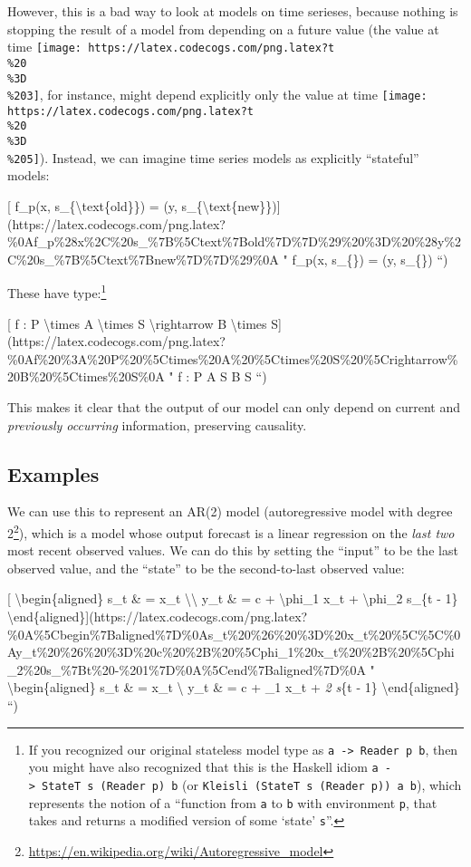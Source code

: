 \documentclass[]{article}
\renewcommand{\href}[2]{#2\footnote{\url{#1}}}
\begin{document}
However, this is a bad way to look at models on time serieses, because nothing
is stopping the result of a model from depending on a future value (the value at
time \texttt{[image: https://latex.codecogs.com/png.latex?t\\\%20\\\%3D\\\%203]}, for
instance, might depend explicitly only the value at time
\texttt{[image: https://latex.codecogs.com/png.latex?t\\\%20\\\%3D\\\%205]}). Instead,
we can imagine time series models as explicitly ``stateful'' models:

{[} f\_p(x, s\_\{\textbackslash{}text\{old\}\}) = (y,
s\_\{\textbackslash{}text\{new\}\}){]}(https://latex.codecogs.com/png.latex?\%0Af\_p\%28x\%2C\%20s\_\%7B\%5Ctext\%7Bold\%7D\%7D\%29\%20\%3D\%20\%28y\%2C\%20s\_\%7B\%5Ctext\%7Bnew\%7D\%7D\%29\%0A
" f\_p(x, s\_\{\}) = (y, s\_\{\}) ``)

These have type:\footnote{If you recognized our original stateless model type as
  \texttt{a\ -\textgreater{}\ Reader\ p\ b}, then you might have also recognized
  that this is the Haskell idiom
  \texttt{a\ -\textgreater{}\ StateT\ s\ (Reader\ p)\ b} (or
  \texttt{Kleisli\ (StateT\ s\ (Reader\ p))\ a\ b}), which represents the notion
  of a ``function from \texttt{a} to \texttt{b} with environment \texttt{p},
  that takes and returns a modified version of some `state' \texttt{s}''.}

{[} f : P \textbackslash{}times A \textbackslash{}times S
\textbackslash{}rightarrow B \textbackslash{}times
S{]}(https://latex.codecogs.com/png.latex?\%0Af\%20\%3A\%20P\%20\%5Ctimes\%20A\%20\%5Ctimes\%20S\%20\%5Crightarrow\%20B\%20\%5Ctimes\%20S\%0A
" f : P \times A \times S \rightarrow B \times S ``)

This makes it clear that the output of our model can only depend on current and
\emph{previously occurring} information, preserving causality.

\hypertarget{examples}{%
\subsection{Examples}\label{examples}}

We can use this to represent an AR(2) model
(\href{https://en.wikipedia.org/wiki/Autoregressive_model}{autoregressive model
with degree 2}), which is a model whose output forecast is a linear regression
on the \emph{last two} most recent observed values. We can do this by setting
the ``input'' to be the last observed value, and the ``state'' to be the
second-to-last observed value:

{[} \textbackslash{}begin\{aligned\} s\_t \& = x\_t
\textbackslash{}\textbackslash{} y\_t \& = c + \textbackslash{}phi\_1 x\_t +
\textbackslash{}phi\_2 s\_\{t - 1\}
\textbackslash{}end\{aligned\}{]}(https://latex.codecogs.com/png.latex?\%0A\%5Cbegin\%7Baligned\%7D\%0As\_t\%20\%26\%20\%3D\%20x\_t\%20\%5C\%5C\%0Ay\_t\%20\%26\%20\%3D\%20c\%20\%2B\%20\%5Cphi\_1\%20x\_t\%20\%2B\%20\%5Cphi\_2\%20s\_\%7Bt\%20-\%201\%7D\%0A\%5Cend\%7Baligned\%7D\%0A
" \textbackslash{}begin\{aligned\} s\_t \& = x\_t \textbackslash{} y\_t \& = c +
\phi\_1 x\_t + \phi\emph{2 s}\{t - 1\} \textbackslash{}end\{aligned\} ``)
\end{document}
